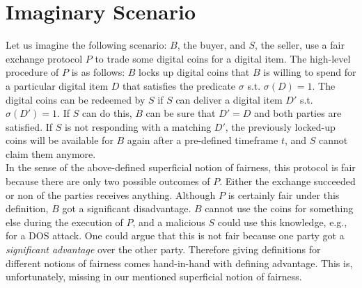 \documentclass{cacthesis}
\newcounter{protocol}
\begin{document}
        \section{Imaginary Scenario}
        Let us imagine the following scenario: $B$, the buyer, and $S$, the seller, use a fair exchange protocol $P$ to trade some digital coins for a digital item. The high-level procedure of $P$ is as follows: $B$ locks up digital coins that $B$ is willing to spend for a particular digital item $D$ that satisfies the predicate $\sigma$ s.t. $\sigma\left( D\right) =1$. The digital coins can be redeemed by $S$ if $S$ can deliver a digital item $D'$ s.t. $\sigma\left( D'\right) =1$. If $S$ can do this, $B$ can be sure that $D' = D$ and both parties are satisfied. If $S$ is not responding with a matching $D'$, the previously locked-up coins will be available for $B$ again after a pre-defined timeframe $t$, and $S$ cannot claim them anymore. \\
        In the sense of the above-defined superficial notion of fairness, this protocol is fair because there are only two possible outcomes of $P$. Either the exchange succeeded or non of the parties receives anything. 
        Although $P$ is certainly fair under this definition, $B$ got a significant disadvantage. $B$ cannot use the coins for something else during the execution of $P$, and a malicious $S$ could use this knowledge, e.g., for a DOS attack. One could argue that this is not fair because one party got a \textit{significant advantage} over the other party. Therefore giving definitions for different notions of fairness comes hand-in-hand with defining advantage. This is, unfortunately, missing in our mentioned superficial notion of fairness. 
        
\end{document}
